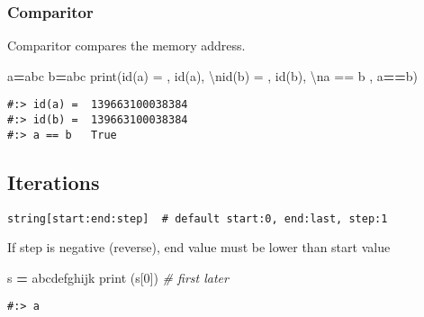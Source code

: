 \documentclass[
]{book}
\newenvironment{Shaded}{\begin{snugshade}}{\end{snugshade}}
\newcommand{\BuiltInTok}[1]{#1}
\newcommand{\CharTok}[1]{\textcolor[rgb]{0.5,0.5,0.5}{#1}}
\newcommand{\CommentTok}[1]{\textcolor[rgb]{0.37,0.37,0.37}{\textit{#1}}}
\newcommand{\DecValTok}[1]{\textcolor[rgb]{0.06,0.06,0.06}{#1}}
\newcommand{\NormalTok}[1]{#1}
\newcommand{\OperatorTok}[1]{\textcolor[rgb]{0.43,0.43,0.43}{\textbf{#1}}}
\newcommand{\StringTok}[1]{\textcolor[rgb]{0.5,0.5,0.5}{#1}}
\begin{document}
\hypertarget{comparitor}{%
\subsubsection{Comparitor}\label{comparitor}}

Comparitor compares the memory address.

\begin{Shaded}
\begin{Highlighting}[]
\NormalTok{a}\OperatorTok{=}\StringTok{\textquotesingle{}abc\textquotesingle{}}
\NormalTok{b}\OperatorTok{=}\StringTok{\textquotesingle{}abc\textquotesingle{}}
\BuiltInTok{print}\NormalTok{(}\StringTok{\textquotesingle{}id(a) = \textquotesingle{}}\NormalTok{, }\BuiltInTok{id}\NormalTok{(a), }
      \StringTok{\textquotesingle{}}\CharTok{\textbackslash{}n}\StringTok{id(b) = \textquotesingle{}}\NormalTok{, }\BuiltInTok{id}\NormalTok{(b),}
      \StringTok{\textquotesingle{}}\CharTok{\textbackslash{}n}\StringTok{a == b  \textquotesingle{}}\NormalTok{, a}\OperatorTok{==}\NormalTok{b)}
\end{Highlighting}
\end{Shaded}

\begin{verbatim}
#:> id(a) =  139663100038384 
#:> id(b) =  139663100038384 
#:> a == b   True
\end{verbatim}

\hypertarget{iterations}{%
\subsection{Iterations}\label{iterations}}

\begin{verbatim}
string[start:end:step]  # default start:0, end:last, step:1
\end{verbatim}

If step is negative (reverse), end value must be lower than start value

\begin{Shaded}
\begin{Highlighting}[]
\NormalTok{s }\OperatorTok{=} \StringTok{\textquotesingle{}abcdefghijk\textquotesingle{}}
\BuiltInTok{print}\NormalTok{ (s[}\DecValTok{0}\NormalTok{])       }\CommentTok{\# first later}
\end{Highlighting}
\end{Shaded}

\begin{verbatim}
#:> a
\end{verbatim}
\end{document}
